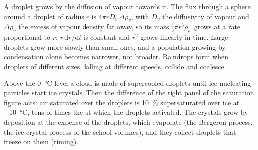 \begin{remark}\label{rem:b2:atmospheric-thermodynamics:growth}
A droplet grows by the diffusion of vapour towards it. The flux through a sphere around a droplet
of radius $r$ is $4\pi r D_v\,\Delta\rho_v$, with $D_v$ the diffusivity of vapour and
$\Delta\rho_v$ the excess of vapour density far away, so its mass $\tfrac43\pi r^3\rho_w$ grows
at a rate proportional to $r$: $r\,\mathrm{d}r/\mathrm{d}t$ is constant and $r^2$ grows linearly in
time. Large droplets grow more slowly than small ones, and a population growing by condensation
alone becomes narrower, not broader. Raindrops form when droplets of different sizes, falling at
different speeds, collide and coalesce.
\end{remark}

Above the \qty{0}{\celsius} level a cloud is made of supercooled droplets until ice nucleating
particles start ice crystals. Then the difference of the right panel of the
saturation figure acts: air saturated over the droplets is \qty{10}{\percent} supersaturated over
ice at \qty{-10}{\celsius}, tens of times the  at which the droplets activated.
The crystals grow by deposition at the expense of the droplets, which evaporate (the Bergeron
process, the ice-crystal process of the school volumes), and they collect droplets that freeze
on them (riming).

